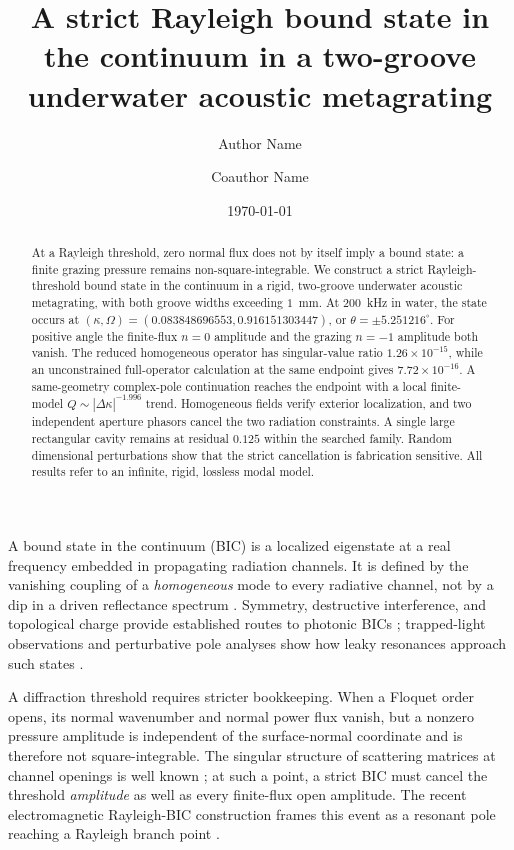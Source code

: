\documentclass[aps,prl,reprint,superscriptaddress,nofootinbib]{revtex4-2}
\begin{document}
\title{A strict Rayleigh bound state in the continuum in a two-groove underwater acoustic metagrating}
\author{Author Name}
\author{Coauthor Name}
\date{\today}

\begin{abstract}
At a Rayleigh threshold, zero normal flux does not by itself imply a bound
state: a finite grazing pressure remains non-square-integrable.  We construct
a strict Rayleigh-threshold bound state in the continuum in a rigid,
two-groove underwater acoustic metagrating, with both groove widths exceeding
$1$~mm.  At $200$~kHz in water, the state occurs at
$(\kappa,\Omega)=(0.083848696553,0.916151303447)$, or
$\theta=\pm5.251216^{\circ}$.  For positive angle the finite-flux $n=0$
amplitude and the grazing $n=-1$ amplitude both vanish.  The reduced
homogeneous operator has singular-value ratio $1.26\times10^{-15}$, while an
unconstrained full-operator calculation at the same endpoint gives
$7.72\times10^{-16}$.  A same-geometry complex-pole continuation reaches the
endpoint with a local finite-model $Q\sim|\Delta\kappa|^{-1.996}$ trend.
Homogeneous fields verify exterior localization, and two independent aperture
phasors cancel the two radiation constraints.  A single large rectangular
cavity remains at residual $0.125$ within the searched family.  Random
dimensional perturbations show that the strict cancellation is fabrication
sensitive.  All results refer to an infinite, rigid, lossless modal model.
\end{abstract}

\maketitle

A bound state in the continuum (BIC) is a localized eigenstate at a real
frequency embedded in propagating radiation channels.  It is defined by the
vanishing coupling of a \emph{homogeneous} mode to every radiative channel,
not by a dip in a driven reflectance spectrum
\cite{Hsu2016BIC,Koshelev2023Review,Azzam2021Review}.  Symmetry, destructive
interference, and topological charge provide established routes to photonic
BICs \cite{Yang2014Analytical,Zhen2014Topological}; trapped-light observations
and perturbative pole analyses show how leaky resonances approach such states
\cite{Hsu2013Observation,Sadrieva2017LeakyResonances,Abdrabou2022FrequencyPerturbation}.

A diffraction threshold requires stricter bookkeeping.  When a Floquet order
opens, its normal wavenumber and normal power flux vanish, but a nonzero
pressure amplitude is independent of the surface-normal coordinate and is
therefore not square-integrable.  The singular structure of scattering
matrices at channel openings is well known
\cite{Rayleigh1907,Wojcik2021ThresholdScattering}; at such a point, a strict
BIC must cancel the threshold \emph{amplitude} as well as every finite-flux
open amplitude.  The recent electromagnetic Rayleigh-BIC construction frames
this event as a resonant pole reaching a Rayleigh branch point
\cite{Karavaev2026Rayleigh}.
\end{document}
